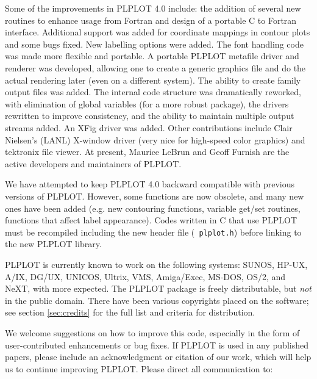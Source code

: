 Some of the improvements in PLPLOT 4.0 include: the addition of several new
routines to enhance usage from Fortran and design of a portable C to
Fortran interface.  Additional support was added for coordinate mappings in
contour plots and some bugs fixed.  New labelling options were added.  The
font handling code was made more flexible and portable.  A portable PLPLOT
metafile driver and renderer was developed, allowing one to create a
generic graphics file and do the actual rendering later (even on a
different system).  The ability to create family output files was added.
The internal code structure was dramatically reworked, with elimination of
global variables (for a more robust package), the drivers rewritten to
improve consistency, and the ability to maintain multiple output streams
added.  An XFig driver was added.  Other contributions include Clair
Nielsen's (LANL) X-window driver (very nice for high-speed color graphics)
and tektronix file viewer.  At present, Maurice LeBrun and Geoff Furnish
are the active developers and maintainers of PLPLOT. 

We have attempted to keep PLPLOT 4.0 backward compatible with previous
versions of PLPLOT.  However, some functions are now obsolete, and many new
ones have been added (e.g.  new contouring functions, variable get/set
routines, functions that affect label appearance).  Codes written in C that
use PLPLOT must be recompiled including the new header file ({\tt
plplot.h}) before linking to the new PLPLOT library. 

PLPLOT is currently known to work on the following systems: SUNOS, HP-UX,
A/IX, DG/UX, UNICOS, Ultrix, VMS, Amiga/Exec, MS-DOS, OS/2, and NeXT, with
more expected.  The PLPLOT package is freely distributable, but {\em not\/}
in the public domain.  There have been various copyrights placed on the
software; see section \ref{sec:credits} for the full list and criteria for
distribution.  

We welcome suggestions on how to improve this code, especially in the form
of user-contributed enhancements or bug fixes.  If PLPLOT is used in any
published papers, please include an acknowledgment or citation of our work,
which will help us to continue improving PLPLOT.  Please direct all
communication to:

